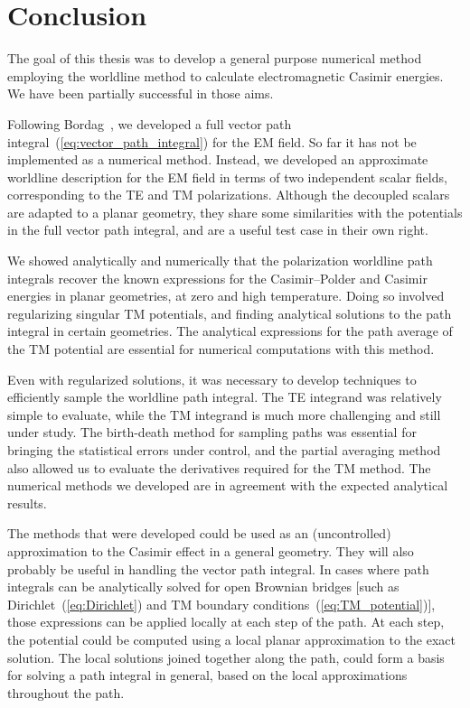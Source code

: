 \chapter{Conclusion}

The goal of this thesis was to develop a general purpose numerical method
employing the worldline method to calculate electromagnetic Casimir energies. 
We have been partially successful in those aims.   %

Following Bordag~\cite{Bordag1998,Bordag1999}, we developed a full vector path integral~(\ref{eq:vector_path_integral}) for
the EM field.  So far it has not be implemented as a numerical method.
Instead, we developed an approximate worldline description for the EM field in terms of two independent scalar fields, corresponding 
to the TE and TM polarizations.   
Although the decoupled scalars are adapted to a planar geometry, 
they share some similarities with the potentials in the full vector
path integral, and are a useful test case in their own right.  

We showed analytically and numerically that the polarization worldline path integrals recover the known expressions for the 
Casimir--Polder and Casimir energies in planar geometries, at zero and high temperature.  
Doing so involved regularizing singular TM potentials, and finding analytical solutions to the path integral
in certain geometries.  The analytical expressions for the path average of the TM potential are 
 essential for numerical computations with this method.  

Even with regularized solutions, it was necessary to develop techniques to efficiently
sample the worldline path integral.  The TE integrand was relatively simple to evaluate, while the TM
integrand is much more challenging and still under study.
The birth-death method for sampling paths was essential for bringing the statistical errors under control, 
and the partial averaging method also allowed us to evaluate the derivatives required for the TM method.
The numerical methods we developed are in agreement with the expected analytical results.

The methods that were developed could be used as an (uncontrolled) approximation to the Casimir effect in a general geometry.
They will also probably be useful in handling the vector path integral.    
In cases where path integrals can be analytically solved for open Brownian bridges [such as
Dirichlet~(\ref{eq:Dirichlet}) and TM boundary conditions~(\ref{eq:TM_potential})], 
those expressions can be applied locally at each step of the path.  
At each step, the potential could be computed using a local planar approximation to the exact solution.
The local solutions joined together along the path, could form a basis for solving a path integral
in general, based on the local approximations throughout the path.  

